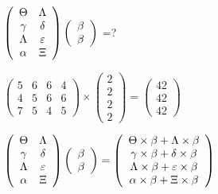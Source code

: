 \documentclass[12pt]{article}
\begin{document}
 
$  %
 \left( \begin{array}
 {
 c
 c
 }
 \Theta & 
 \Lambda \\ 
 \gamma & 
 \delta \\ 
 \Lambda & 
 \varepsilon \\ 
 \alpha & 
                    \Xi
 \end{array} \right)
 \left( \begin{array}
 {
 c
 }
 \beta \\ 
 \beta
 \end{array} \right)
$ =?
 
 
 
\noindent{}
 
 

 
$\left( \begin{array}{ccccccccccccccc}
           5  & 
           6  & 
           6  & 
           4  \\ 
           4  & 
           5  & 
           6  & 
           6  \\ 
           7  & 
           5  & 
           4  & 
           5
\end{array}\right) \times
\left( \begin{array}{c}
           2  \\ 
           2  \\ 
           2  \\ 
           2
\end{array}\right)  =
\left( \begin{array}{c}
          42  \\ 
          42  \\ 
          42
\end{array}\right)  $
 
$  %
 \left( \begin{array}
 {
 c
 c
 }
 \Theta & 
 \Lambda \\ 
 \gamma & 
 \delta \\ 
 \Lambda & 
 \varepsilon \\ 
 \alpha & 
                    \Xi
 \end{array} \right)
 \left( \begin{array}
 {
 c
 }
 \beta \\ 
 \beta
 \end{array} \right)
=
 \left( \begin{array}
 {
 c
 }
  \Theta \times  \beta +  \Lambda \times  \beta \\ 
  \gamma \times  \beta +  \delta \times  \beta \\ 
  \Lambda \times  \beta +  \varepsilon \times  \beta \\ 
  \alpha \times  \beta +                     \Xi \times  \beta
 \end{array} \right)
$
 
\end{document}
